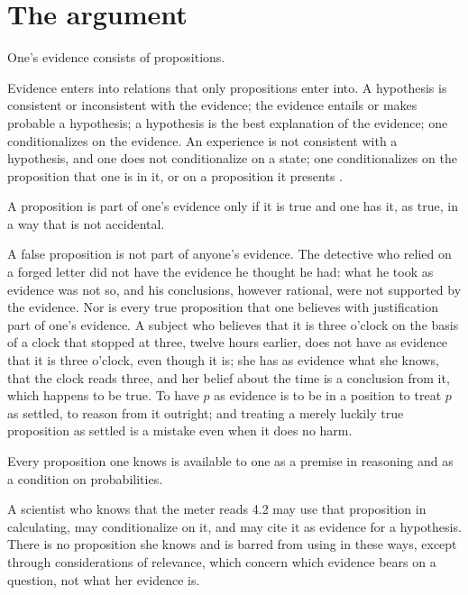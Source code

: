 \documentclass{situationist-preprint}
\begin{document}
\section{The argument}

\begin{principle}[Propositionality]\label{p:prop}
One's evidence consists of propositions.
\end{principle}

Evidence enters into relations that only propositions enter into. A hypothesis is consistent or inconsistent with the evidence; the evidence entails or makes probable a hypothesis; a hypothesis is the best explanation of the evidence; one conditionalizes on the evidence. An experience is not consistent with a hypothesis, and one does not conditionalize on a state; one conditionalizes on the proposition that one is in it, or on a proposition it presents \citep[ch.~9]{Williamson2000}.

\begin{principle}\label{p:poss}
A proposition is part of one's evidence only if it is true and one has it, as true, in a way that is not accidental.
\end{principle}

A false proposition is not part of anyone's evidence. The detective who relied on a forged letter did not have the evidence he thought he had: what he took as evidence was not so, and his conclusions, however rational, were not supported by the evidence. Nor is every true proposition that one believes with justification part of one's evidence. A subject who believes that it is three o'clock on the basis of a clock that stopped at three, twelve hours earlier, does not have as evidence that it is three o'clock, even though it is; she has as evidence what she knows, that the clock reads three, and her belief about the time is a conclusion from it, which happens to be true. To have $p$ as evidence is to be in a position to treat $p$ as settled, to reason from it outright; and treating a merely luckily true proposition as settled is a mistake even when it does no harm.

\begin{principle}[Availability]\label{p:avail}
Every proposition one knows is available to one as a premise in reasoning and as a condition on probabilities.
\end{principle}

A scientist who knows that the meter reads 4.2 may use that proposition in calculating, may conditionalize on it, and may cite it as evidence for a hypothesis. There is no proposition she knows and is barred from using in these ways, except through considerations of relevance, which concern which evidence bears on a question, not what her evidence is.
\end{document}
